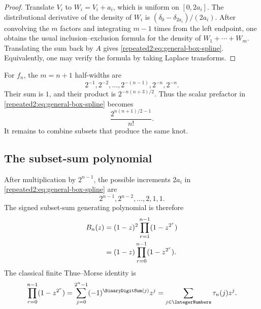 \documentclass[11pt,oneside]{article}
\theoremstyle{definition}
\theoremstyle{remark}
\begin{document}
\begin{proof}
Translate $V_i$ to $W_i=V_i+a_i$, which is uniform on $[0,2a_i]$.  The distributional
derivative of the density of $W_i$ is
$(\delta_0-\delta_{2a_i})/(2a_i)$.  After convolving the $m$ factors and integrating
$m-1$ times from the left endpoint, one obtains the usual inclusion--exclusion formula
for the density of $W_1+\cdots+W_m$.  Translating the sum back by $A$ gives
\eqref{repeated2:eq:general-box-spline}.  Equivalently, one may verify the formula by taking
Laplace transforms.
\end{proof}

For $f_n$, the $m=n+1$ half-widths are
\begin{equation}
 2^{-1},2^{-2},\ldots,2^{-(n-1)},2^{-n},2^{-n}.
 \label{repeated2:eq:fn-halfwidths}
\end{equation}
Their sum is $1$, and their product is $2^{-n(n+3)/2}$.  Thus the scalar prefactor in
\eqref{repeated2:eq:general-box-spline} becomes
\begin{equation}
 \frac{2^{n(n+1)/2-1}}{n!}.
 \label{repeated2:eq:box-prefactor}
\end{equation}
It remains to combine subsets that produce the same knot.

\subsection{The subset-sum polynomial}

After multiplication by $2^{n-1}$, the possible increments $2a_i$ in
\eqref{repeated2:eq:general-box-spline} are
\begin{equation}
 2^{n-1},2^{n-2},\ldots,2,1,1.
 \label{repeated2:eq:integer-increments}
\end{equation}
The signed subset-sum generating polynomial is therefore
\begin{align}
 B_n(z)
 &=(1-z)^2\prod_{r=1}^{n-1}(1-z^{2^r}) \notag\\
 &=(1-z)\prod_{r=0}^{n-1}(1-z^{2^r}).
 \label{repeated2:eq:subset-polynomial}
\end{align}
The classical finite Thue--Morse identity is
\begin{equation}
 \prod_{r=0}^{n-1}(1-z^{2^r})
 =\sum_{j=0}^{2^n-1}(-1)^{\BinaryDigitSum(j)}z^j
 =\sum_{j\in\IntegerNumbers}\tau_n(j)z^j.
 \label{repeated2:eq:thue-morse-product}
\end{equation}
\end{document}
